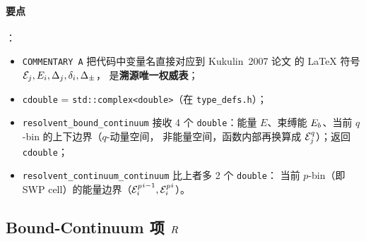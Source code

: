 

\paragraph{要点}：
\begin{itemize}
  \item \texttt{COMMENTARY A} 把代码中变量名直接对应到 Kukulin~2007 论文
        的 LaTeX 符号 \(\mathcal{E}_j, E_i, \Delta_j, \delta_i, \Delta_\pm\)，
        是\textbf{溯源唯一权威表}；
  \item \texttt{cdouble} = \texttt{std::complex<double>}（在
        \texttt{type\_defs.h}）；
  \item \texttt{resolvent\_bound\_continuum} 接收 4 个 \texttt{double}：能量
        \(E\)、束缚能 \(E_b\)、当前 \(q\)-bin 的上下边界（\(q\)-动量空间，
        非能量空间，函数内部再换算成 \({\mathcal{E}_{j}^{q}}\)）；返回 \texttt{cdouble}；
  \item \texttt{resolvent\_continuum\_continuum} 比上者多 2 个 \texttt{double}：
        当前 \(p\)-bin（即 SWP cell）的能量边界（\({\mathcal{E}_{i}^{p}}^{i-1}, {\mathcal{E}_{i}^{p}}^{i}\)）。
\end{itemize}

\subsection{Bound-Continuum 项 \(R\)}
\label{subsec:ch10-code-BC}





